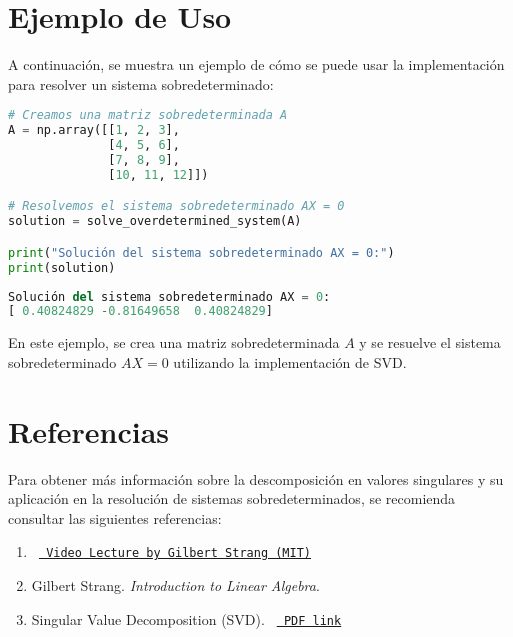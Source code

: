 \documentclass{article}
\begin{document}
    \section{Ejemplo de Uso}
    A continuación, se muestra un ejemplo de cómo se puede usar la implementación para resolver un sistema sobredeterminado:

    \begin{lstlisting}[language=Python, caption=Ejemplo de uso de la implementación]
# Creamos una matriz sobredeterminada A
A = np.array([[1, 2, 3],
              [4, 5, 6],
              [7, 8, 9],
              [10, 11, 12]])

# Resolvemos el sistema sobredeterminado AX = 0
solution = solve_overdetermined_system(A)

print("Solución del sistema sobredeterminado AX = 0:")
print(solution)

    \end{lstlisting}
    \begin{lstlisting}[language=Python, caption=Salida del ejemplo]
Solución del sistema sobredeterminado AX = 0:
[ 0.40824829 -0.81649658  0.40824829]
    \end{lstlisting}

    \noindent
    En este ejemplo, se crea una matriz sobredeterminada $A$ y se resuelve el sistema sobredeterminado $AX = 0$ utilizando la implementación de SVD.


    \section{Referencias}
    Para obtener más información sobre la descomposición en valores singulares y su aplicación en la resolución de sistemas sobredeterminados,
    se recomienda consultar las siguientes referencias:

    \begin{enumerate}
        \item  \texttt{%
            \href{https://https://ocw.mit.edu/courses/18-06-linear-algebra-spring-2010/resources/lecture-29-singular-value-decomposition/}{%
                Video Lecture by Gilbert Strang (MIT)}%
        }
        \item Gilbert Strang. \textit{Introduction to Linear Algebra}.
        \item Singular Value Decomposition (SVD).
          \texttt{%
            \href{https://www.cs.cmu.edu/~venkatg/teaching/CStheory-infoage/book-chapter-4.pdf}{%
                PDF link}%
        }
    \end{enumerate}
\end{document}
